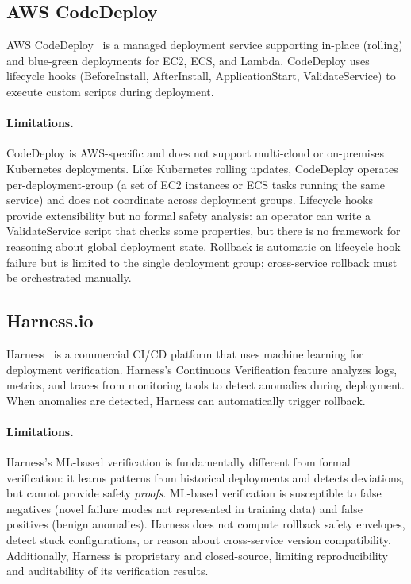 \documentclass[10pt,twocolumn]{article}
\begin{document}
\subsection{AWS CodeDeploy}

AWS CodeDeploy~\cite{aws-codedeploy} is a managed deployment
service supporting in-place (rolling) and blue-green deployments
for EC2, ECS, and Lambda. CodeDeploy uses lifecycle hooks
(BeforeInstall, AfterInstall, ApplicationStart, ValidateService)
to execute custom scripts during deployment.

\paragraph{Limitations.}
CodeDeploy is AWS-specific and does not support multi-cloud or
on-premises Kubernetes deployments. Like Kubernetes rolling
updates, CodeDeploy operates per-deployment-group (a set of
EC2 instances or ECS tasks running the same service) and does
not coordinate across deployment groups. Lifecycle hooks provide
extensibility but no formal safety analysis: an operator can
write a ValidateService script that checks some properties, but
there is no framework for reasoning about global deployment
state. Rollback is automatic on lifecycle hook failure but is
limited to the single deployment group; cross-service rollback
must be orchestrated manually.

\subsection{Harness.io}

Harness~\cite{harness} is a commercial CI/CD platform that
uses machine learning for deployment verification. Harness's
Continuous Verification feature analyzes logs, metrics, and
traces from monitoring tools to detect anomalies during
deployment. When anomalies are detected, Harness can
automatically trigger rollback.

\paragraph{Limitations.}
Harness's ML-based verification is fundamentally different from
formal verification: it learns patterns from historical
deployments and detects deviations, but cannot provide
safety \emph{proofs}. ML-based verification is susceptible to
false negatives (novel failure modes not represented in training
data) and false positives (benign anomalies). Harness does not
compute rollback safety envelopes, detect stuck configurations,
or reason about cross-service version compatibility.
Additionally, Harness is proprietary and closed-source, limiting
reproducibility and auditability of its verification results.
\end{document}
